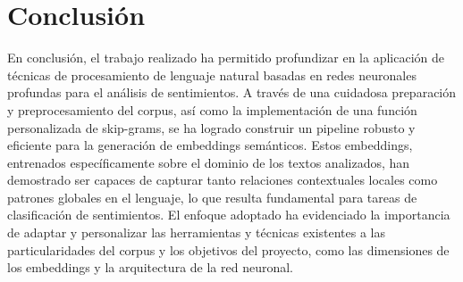 \section{Conclusión}
En conclusión, el trabajo realizado ha permitido profundizar en la aplicación de técnicas de procesamiento de lenguaje natural 
basadas en redes neuronales profundas para el análisis de sentimientos. A través de una cuidadosa preparación y preprocesamiento 
del corpus, así como la implementación de una función personalizada de skip-grams, se ha logrado construir un pipeline robusto y
eficiente para la generación de embeddings semánticos. Estos embeddings, entrenados específicamente sobre el dominio de los textos 
analizados, han demostrado ser capaces de capturar tanto relaciones contextuales locales como patrones globales en el lenguaje, lo
que resulta fundamental para tareas de clasificación de sentimientos. El enfoque adoptado ha evidenciado la importancia de adaptar
y personalizar las herramientas y técnicas existentes a las particularidades del corpus y los objetivos del proyecto, como las dimensiones
de los embeddings y la arquitectura de la red neuronal.